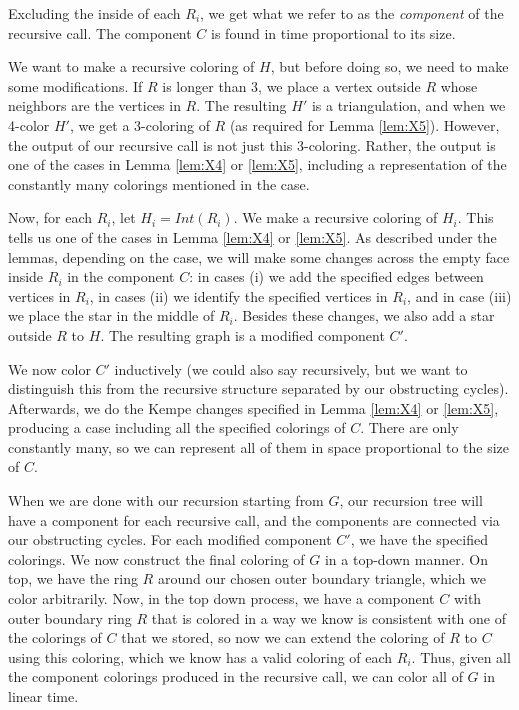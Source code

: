 \documentclass[10pt,a4paper]{article}
\begin{document}
Excluding the inside of each $R_i$, we get what we refer to as the \emph{component} of the recursive call. The component $C$ is found in time proportional to its size. 

We want to make a recursive coloring of $H$, but before doing so, we need to make some modifications. If $R$ is longer than 3, we place a vertex outside $R$ whose neighbors are the vertices in $R$. The resulting $H'$ is a triangulation, and when we 4-color $H'$,
we get a 3-coloring of $R$ (as required for Lemma \ref{lem:X5}). However, the output of our recursive call is not just this 3-coloring. Rather, the output is one of the cases in Lemma \ref{lem:X4} or \ref{lem:X5}, including 
a representation of the constantly many colorings mentioned in the case.

Now, for each $R_i$, let $H_i=Int(R_i)$. We make a recursive coloring of $H_i$. This tells us one of the cases
in Lemma \ref{lem:X4} or \ref{lem:X5}. As described under the lemmas, depending on the case, we will make some changes across the empty face inside $R_i$ in the component $C$: in cases (i) we add the specified edges between vertices in $R_i$, in cases (ii) we identify the specified vertices in $R_i$, and in case (iii) we place the star in the middle of $R_i$. Besides these changes, we also add a star outside $R$ to $H$. The resulting graph is a modified component $C'$.

We now color $C'$ inductively (we could also say recursively, but we want to distinguish this from the recursive structure separated by our obstructing cycles).
Afterwards, we do the Kempe changes specified 
in Lemma \ref{lem:X4} or \ref{lem:X5}, producing a case including all the specified colorings of $C$. There are only constantly many, so we can represent all of them in space proportional to the size of $C$.


When we are done with our recursion starting from $G$, our recursion tree will have a component for each recursive call, and the components are connected via our 
obstructing cycles. For each modified component $C'$, we have the specified colorings. We now construct the final coloring of $G$ in a top-down manner. On top, we have the ring $R$ around our chosen outer boundary triangle, which we color arbitrarily. Now, in the top down process, we have a component $C$ with outer boundary ring $R$ that is colored in a way we know is consistent with one of the colorings of $C$ that we stored, so now we can extend the coloring of $R$ to $C$ using this coloring, which we know has a valid coloring of each $R_i$. Thus, given all the component colorings produced in the recursive call, we can color all of $G$ in linear time.
\end{document}
